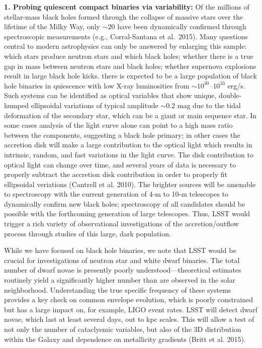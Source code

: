 {\bf 1. Probing quiescent compact binaries via variability:} Of the
millions of stellar-mass black holes formed through the collapse of
massive stars over the lifetime of the Milky Way, only $\sim 20$ have
been dynamically confirmed through spectroscopic measurements (e.g.,
Corral-Santana et al.~2015). Many questions central to modern
astrophysics can only be answered by enlarging this sample: which
stars produce neutron stars and which black holes; whether there is a
true gap in mass between neutron stars and black holes; whether
supernova explosions result in large black hole kicks. there is
expected to be a large population of black hole binaries in quiescence
with low X-ray luminosities from $\sim 10^{30}$--$10^{33}$ erg/s.
Such systems can be identified as optical variables that show unique,
double-humped ellipsoidal variations of typical amplitude $\sim 0.2$
mag due to the tidal deformation of the secondary star, which can be a
giant or main sequence star. In some cases analysis of the light curve
alone can point to a high mass ratio between the components,
suggesting a black hole primary; in other cases the accretion disk
will make a large contribution to the optical light which results in
intrinsic, random, and fast variations in the light curve. The disk
contribution to optical light can change over time, and several years
of data is necessary to properly subtract the accretion disk
contribution in order to properly fit ellipsoidal veriations (Cantrell
et al. 2010). The brighter sources will be amenable to spectroscopy
with the current generation of 4-m to 10-m telescopes to dynamically
confirm new black holes; spectroscopy of all candidates should be
possible with the forthcoming generation of large telescopes. Thus,
LSST would trigger a rich variety of observational investigations of
the accretion/outflow process through studies of this large, dark
population.

While we have focused on black hole binaries, we note that LSST would
be crucial for investigations of neutron star and white dwarf
binaries. The total number of dwarf novae is presently poorly
understood---theoretical estimates routinely yield a significantly
higher number than are observed in the solar
neighborhood. Understanding the true specific frequency of these
systems provides a key check on common envelope evolution, which is
poorly constrained but has a large impact on, for example, LIGO event
rates. LSST will detect dwarf novae, which last at least several days,
out to kpc scales. This will allow a test of not only the number of
cataclysmic variables, but also of the 3D distribution within the
Galaxy and dependence on metallicity gradients (Britt et al. 2015).

